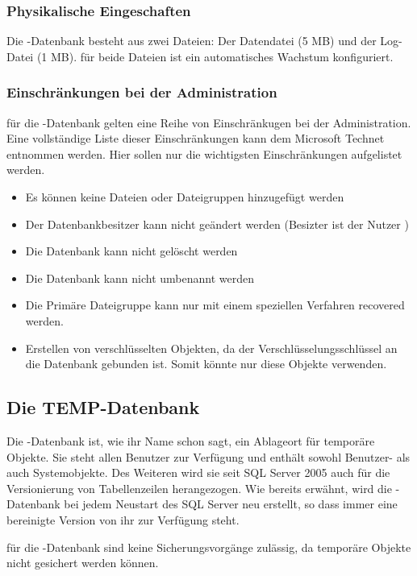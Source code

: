         \subsubsection{Physikalische Eingeschaften}
          Die -Datenbank besteht aus zwei Dateien: Der
          Datendatei  (5 MB) und der Log-Datei
           (1 MB). f\"ur beide Dateien ist ein
          automatisches Wachstum konfiguriert.
        \subsubsection{Einschränkungen bei der Administration}
          f\"ur die -Datenbank gelten eine Reihe von
          Einschränkugen bei der Administration. Eine vollständige Liste dieser
          Einschränkungen kann dem Microsoft Technet entnommen werden. Hier
          sollen nur die wichtigsten Einschränkungen aufgelistet werden.
          \begin{itemize}
            \item Es können keine Dateien oder Dateigruppen hinzugefügt werden
            \item Der Datenbankbesitzer kann nicht geändert werden (Besizter
            ist der Nutzer )
            \item Die Datenbank kann nicht gelöscht werden
            \item Die Datenbank kann nicht umbenannt werden
            \item Die Primäre Dateigruppe kann nur mit einem
            speziellen Verfahren recovered werden.
            \item Erstellen von verschlüsselten Objekten, da der
            Verschlüsselungsschlüssel an die Datenbank gebunden ist. Somit
            könnte nur  diese Objekte verwenden.
          \end{itemize}
          \begin{literaturinternet}
            \item \cite{ms186388}
          \end{literaturinternet}          
      \subsection{Die TEMP-Datenbank}
        Die -Datenbank ist, wie ihr Name schon sagt, ein
        Ablageort f\"ur temporäre Objekte. Sie steht allen Benutzer zur Verfügung
        und enthält sowohl Benutzer- als auch Systemobjekte. Des Weiteren wird
        sie seit SQL Server 2005 auch f\"ur die Versionierung von Tabellenzeilen
        herangezogen. Wie bereits erwähnt, wird die
        -Datenbank bei jedem Neustart des SQL Server neu
        erstellt, so dass immer eine bereinigte Version von ihr zur Verfügung
        steht.
        \begin{merke}
          f\"ur die -Datenbank sind keine Sicherungsvorgänge
          zulässig, da temporäre Objekte nicht gesichert werden können.
        \end{merke}
